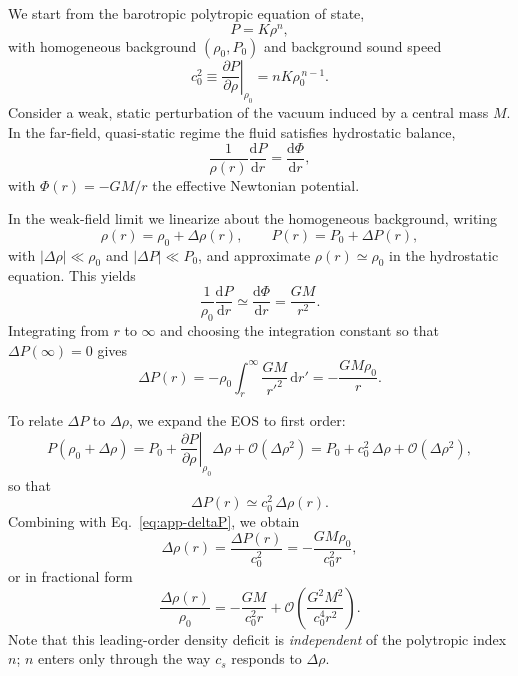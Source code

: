 \documentclass[11pt]{article}
\begin{document}
We start from the barotropic polytropic equation of state,
\begin{equation}
  P = K \rho^n,
\end{equation}
with homogeneous background $(\rho_0, P_0)$ and background sound speed
\begin{equation}
  c_0^2 \equiv
  \left.\frac{\partial P}{\partial \rho}\right|_{\rho_0}
  = n K \rho_0^{\,n-1}.
\end{equation}
Consider a weak, static perturbation of the vacuum induced by a central
mass $M$.
In the far-field, quasi-static regime the fluid satisfies hydrostatic
balance,
\begin{equation}
  \frac{1}{\rho(r)}\frac{\mathrm{d}P}{\mathrm{d}r}
  = \frac{\mathrm{d}\Phi}{\mathrm{d}r},
\end{equation}
with $\Phi(r) = -GM/r$ the effective Newtonian potential.

In the weak-field limit we linearize about the homogeneous background,
writing
\begin{equation}
  \rho(r) = \rho_0 + \Delta\rho(r),
  \qquad
  P(r) = P_0 + \Delta P(r),
\end{equation}
with $|\Delta\rho| \ll \rho_0$ and $|\Delta P| \ll P_0$, and approximate
$\rho(r) \simeq \rho_0$ in the hydrostatic equation.
This yields
\begin{equation}
  \frac{1}{\rho_0}\frac{\mathrm{d}P}{\mathrm{d}r}
  \simeq \frac{\mathrm{d}\Phi}{\mathrm{d}r}
  = \frac{GM}{r^2}.
\end{equation}
Integrating from $r$ to $\infty$ and choosing the integration constant so
that $\Delta P(\infty)=0$ gives
\begin{equation}
  \Delta P(r)
  = -\rho_0\int_r^\infty \frac{GM}{r'^2}\,\mathrm{d}r'
  = -\frac{GM\rho_0}{r}.
  \label{eq:app-deltaP}
\end{equation}

To relate $\Delta P$ to $\Delta\rho$, we expand the EOS to first order:
\begin{equation}
  P(\rho_0 + \Delta\rho)
  = P_0 + \left.\frac{\partial P}{\partial \rho}\right|_{\rho_0}\Delta\rho
        + \mathcal{O}(\Delta\rho^2)
  = P_0 + c_0^2\,\Delta\rho + \mathcal{O}(\Delta\rho^2),
\end{equation}
so that
\begin{equation}
  \Delta P(r) \simeq c_0^2\,\Delta\rho(r).
\end{equation}
Combining with Eq.~\eqref{eq:app-deltaP}, we obtain
\begin{equation}
  \Delta\rho(r)
  = \frac{\Delta P(r)}{c_0^2}
  = -\frac{GM\rho_0}{c_0^2 r},
\end{equation}
or in fractional form
\begin{equation}
  \frac{\Delta\rho(r)}{\rho_0}
  = -\frac{GM}{c_0^2 r}
  + \mathcal{O}\!\left(\frac{G^2M^2}{c_0^4 r^2}\right).
  \label{eq:app-deltarho}
\end{equation}
Note that this leading-order density deficit is \emph{independent} of the
polytropic index $n$; $n$ enters only through the way $c_s$ responds to
$\Delta\rho$.
\end{document}
